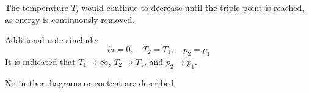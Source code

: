 The temperature \( T_i \) would continue to decrease until the triple point is reached, as energy is continuously removed.  

Additional notes include:  
\[
\dot{m} = 0, \quad T_2 = T_1, \quad p_2 = p_1
\]  
It is indicated that \( T_1 \to \infty \), \( T_2 \to T_1 \), and \( p_2 \to p_1 \).  

No further diagrams or content are described.